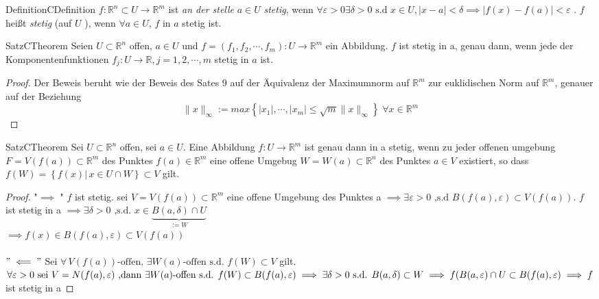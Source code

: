 \documentclass[11.5 pt, a4paper]{memoir}
\begin{document}
\begin{ibox}[]{Definition}{CDefinition}
    $ f: \mathbb{R}^n  \subset U \to \mathbb{R}^m $ ist \textit{an der stelle} $ a \in  U $ \textit{stetig}, wenn $ \forall \varepsilon 
	>0 \exists \delta >0 \text{ s.d } x \in  U, \left| x-a \right| < \delta \implies \left| f(x)-f(a) \right| < \varepsilon $ . $ f $ heißt
	\textit{stetig} (auf $ U $ ), wenn $ \forall  a \in U $, $ f \text{ in } a $ stetig ist. 
\end{ibox}

\begin{ibox}[14]{Satz}{CTheorem}
    Seien $ U \subset \mathbb{R}^n  $ offen, $ a \in  U $ und $ f=(f_1,f_2,\cdots, f_m): U \to \mathbb{R}^m  $ ein Abbildung. $ f $ ist 
	stetig in a, genau dann, wenn jede der Komponentenfunktionen $ f_{j} :U \to \mathbb{R} , j = 1,2, \cdots, m $ stetig in $ a $ ist.
\end{ibox}

\begin{proof}
	Der Beweis beruht wie der Beweis des Sates 9 auf der Äquivalenz der Maximumnorm auf $ \mathbb{R}^m $ zur euklidischen Norm auf 
	$ \mathbb{R}^m $, genauer auf der Beziehung
	$$ \|x \|_{\infty}:= max \left\{ \left| x_1 \right| ,\cdots, \left| x_m \right| \leq \sqrt{m} \|x \|_{\infty} \right\} \;  
	\forall  x \in  \mathbb{R}^m$$
	
\end{proof}
\begin{ibox}[15]{Satz}{CTheorem}
    Sei $ U \subset  \mathbb{R}^n  $ offen, sei $ a \in  U $. Eine Abbildung $ f: U \to \mathbb{R}^m $ ist genau dann in a stetig,
	wenn zu jeder offenen umgebung $ F=V(f(a)) \subset \mathbb{R}^m $ des Punktes $ f(a) \in \mathbb{R}^m $ eine offene Umgebug
	$ W = W(a) \subset  \mathbb{R}^n  $ des Punktes $ a \in  V$ existiert, so dass $ f(W) = \left\{ f(x) |\, x \in U \cap W \right\} 
	\subset  V$ gilt. 
\end{ibox}

\begin{proof}
	"$  \implies$ " $ f $ ist stetig. sei $ V = V \left( f \left( a \right)  \right)  \subset  \mathbb{R}^m $ 
	eine offene Umgebung des Punktes a  $ \implies \exists 
	\varepsilon  >0 \text{ ,s.d } B(f(a), \varepsilon ) \subset  V(f(a))$. $ f $ ist stetig in a $ \implies \exists \delta > 0 
	\text{ ,s.d. } x \in  \underbrace{B(a, \delta) \cap U}_{:=W} $ \\ $\implies f(x) \in B(f(a), \varepsilon ) \subset  V(f(a))$\\ \\
	$ "\impliedby" $ Sei $ \forall \, V(f(a)) \text{-offen, } \exists W(a) \text{-offen s.d. } f(W) \subset  V $ gilt.
	$ \forall \varepsilon >0 \text{ sei } V = N(f(a), \varepsilon ) \\
	\text{ ,dann } \exists W(a) \text{-offen s.d. } f(W) \subset B(f(a), \varepsilon ) \implies 
	\exists  \delta >0 \text{ s.d. } B(a,\delta) \subset  W \\ 
	\implies  f(B(a, \varepsilon ) \cap U \subset B(f(a), \varepsilon ) \implies 
	f$ ist stetig in a   
\end{proof}
\end{document}
